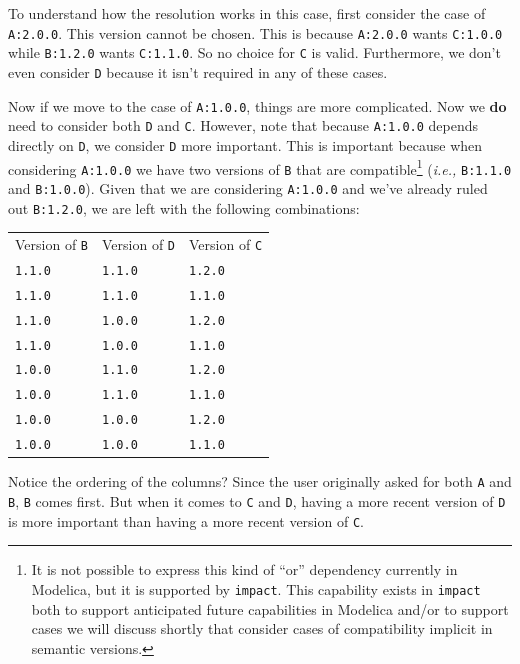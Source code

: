 \documentclass[11pt,a4paper,twocolumn]{article}
\renewcommand{\small}{\fontsize{9.5pt}{11.1pt}\selectfont}
\newcommand{\code}[1]{\texttt{#1}} %
\begin{document}
To understand how the resolution works in this case, first consider
the case of \code{A:2.0.0}.  This version cannot be chosen.  This is
because \code{A:2.0.0} wants \code{C:1.0.0} while \code{B:1.2.0}
wants \code{C:1.1.0}.  So no choice for \code{C} is valid.
Furthermore, we don't even consider \code{D} because it isn't
required in any of these cases.

Now if we move to the case of \code{A:1.0.0}, things are more
complicated.  Now we \textbf{do} need to consider both \code{D} and
\code{C}.  However, note that because \code{A:1.0.0} depends
directly on \code{D}, we consider \code{D} more important.  This is
important because when considering \code{A:1.0.0} we have two
versions of \code{B} that are compatible\footnote{It is not possible
  to express this kind of ``or'' dependency currently in Modelica, but
  it is supported by \code{impact}.  This capability exists in
  \code{impact} both to support anticipated future capabilities in
  Modelica \parencite{impact-MCP} and/or to support cases we will discuss shortly
  that consider cases of compatibility implicit in semantic versions.}
(\emph{i.e.,} \code{B:1.1.0} and \code{B:1.0.0}).  Given that we are
considering \code{A:1.0.0} and we've already ruled out \code{B:1.2.0},
we are left with the following combinations:
{\small
\begin{center}
\begin{tabular}{lll}
  Version of \code{B} & Version of \code{D} & Version of \code{C} \\
  \code{1.1.0} & \code{1.1.0} & \code{1.2.0} \\
  \code{1.1.0} & \code{1.1.0} & \code{1.1.0} \\
  \code{1.1.0} & \code{1.0.0} & \code{1.2.0} \\
  \code{1.1.0} & \code{1.0.0} & \code{1.1.0} \\
  \code{1.0.0} & \code{1.1.0} & \code{1.2.0} \\
  \code{1.0.0} & \code{1.1.0} & \code{1.1.0} \\
  \code{1.0.0} & \code{1.0.0} & \code{1.2.0} \\
  \code{1.0.0} & \code{1.0.0} & \code{1.1.0} \\
\end{tabular}
\end{center}
}
Notice the ordering of the columns?  Since the user originally asked
for both \code{A} and \code{B}, \code{B} comes first.  But when it
comes to \code{C} and \code{D}, having a more recent version of
\code{D} is more important than having a more recent version of
\code{C}.
\end{document}

